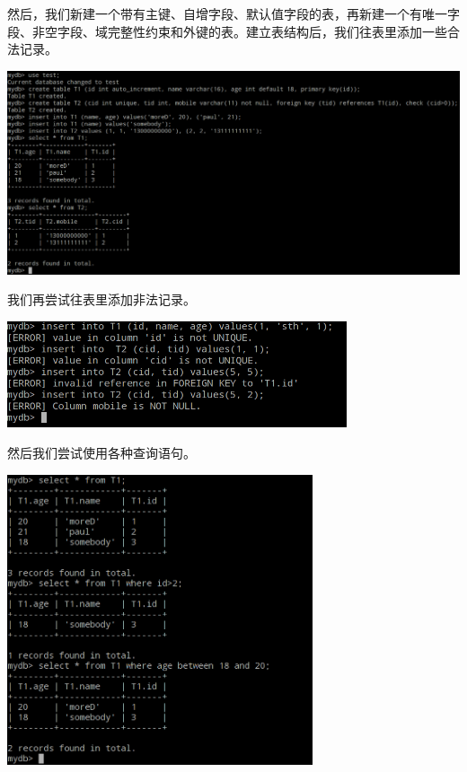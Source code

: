 \documentclass[11pt, a4paper]{article}
\makeatletter
\newcommand\fcaption{\def\@captype{figure}\caption}
\makeatother
\begin{document}
然后，我们新建一个带有主键、自增字段、默认值字段的表，再新建一个有唯一字段、非空字段、域完整性约束和外键的表。建立表结构后，我们往表里添加一些合法记录。

\begin{center}
    \includegraphics[width=15cm]{fig/create-table}
    \fcaption{建表并插入记录}
\end{center}

我们再尝试往表里添加非法记录。

\begin{center}
    \includegraphics[width=10cm]{fig/illegal-record}
    \fcaption{插入非法记录时报错}
\end{center}

然后我们尝试使用各种查询语句。

\begin{center}
    \includegraphics[width=9cm]{fig/query1}
    \fcaption{查询1}
\end{center}
\end{document}
